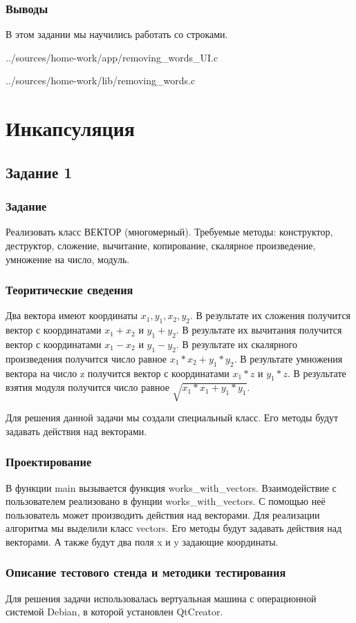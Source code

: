 \documentclass[12pt,a4paper]{report}
\begin{document}
\subsection{Выводы}
В этом задании мы научились работать со строками.

{../sources/home-work/app/removing_words_UI.c}


{../sources/home-work/lib/removing_words.c}
\chapter{Инкапсуляция}
\section{Задание 1}
\subsection{Задание}
Реализовать класс ВЕКТОР (многомерный). Требуемые методы: конструктор, деструктор, сложение, вычитание, копирование, скалярное произведение, умножение на число, модуль.
\subsection{Теоритические сведения}
Два вектора имеют координаты $ x_1, y_1, x_2, y_2 $. В результате их сложения получится вектор с координатами $ x_1+x_2 $ и $ y_1+y_2 $. В результате их вычитания получится вектор с координатами $ x_1-x_2 $ и $ y_1-y_2 $. В результате их скалярного произведения получится число равное $ x_1 * x_2 + y_1 * y_2 $. В результате умножения вектора на число z получится вектор с координатами $ x_1*z $ и $ y_1*z $. В результате взятия модуля получится число равное $ \sqrt{x_1*x_1+y_1*y_1} $. 

Для решения данной задачи мы создали специальный класс. Его методы будут задавать действия над векторами.
\subsection{Проектирование}
В функции main вызывается функция works\_with\_vectors. Взаимодействие с пользователем реализовано в фунции works\_with\_vectors. С помощью неё пользователь может производить действия над векторами. Для реализации алгоритма мы выделили класс vectors. Его методы будут задавать действия над векторами. А также будут два поля x и y задающие координаты.
\subsection{Описание тестового стенда и методики тестирования}
Для решения задачи использовалась вертуальная машина с операционной системой Debian, в которой установлен QtCreator. 
\end{document}
